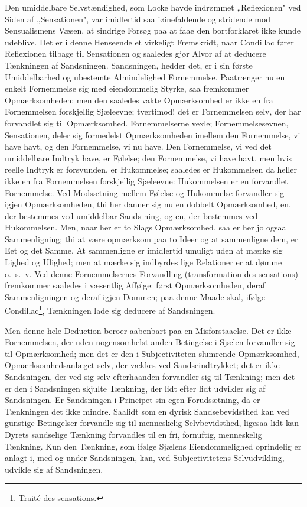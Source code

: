 \documentclass[12pt]{book}
\newcommand{\opage}[1]{\marginnote{\footnotesize\textit{[#1]}}}
\begin{document}
Den umiddelbare Selvstændighed, som Locke havde indrømmet „Reflexionen" ved Siden af
„Sensationen", var imidlertid saa iøinefaldende og stridende mod Sensualismens Væsen,
at sindrige Forsøg paa at faae den bortforklaret ikke kunde udeblive. Det er i denne
Henseende et virkeligt Fremskridt, naar Condillac fører Reflexionen tilbage til
Sensationen og saaledes gjør Alvor af at deducere Tænkningen af Sandsningen.
Sandsningen, hedder det, er i sin første Umiddelbarhed og ubestemte Almindelighed
Fornemmelse. Paatrænger nu en enkelt Fornemmelse sig med eiendommelig Styrke, saa
fremkommer Opmærksomheden; men den saaledes vakte Opmærksomhed er ikke en fra
Fornemmelsen forskjellig Sjæleevne; tvertimod! det er Fornemmelsen selv, der har
forvandlet sig til Opmærksomhed. Fornemmelserne vexle; Fornemmelsesevnen,
Sensationen, deler sig formedelst Opmærksomheden imellem den Fornemmelse, vi have
havt, og den Fornemmelse, vi nu have. Den Fornemmelse, vi ved det umiddelbare Indtryk
have, er Følelse; den Fornemmelse, vi have havt, men hvis reelle Indtryk er
forsvunden, er Hukommelse; saaledes er Hukommelsen da heller ikke en fra Fornemmelsen
forskjellig Sjæleevne: Hukommelsen er en forvandlet Fornemmelse. Ved Modsætning
mellem Følelse og Hukommelse forvandler sig igjen Opmærksomheden, thi her danner sig
nu en dobbelt Opmærksomhed, en, der bestemmes ved umiddelbar Sands%
\opage{27} ning, og en, der bestemmes ved Hukommelsen. Men, naar her er to Slags Opmærksomhed,
saa er her jo ogsaa Sammenligning; thi at være opmærksom paa to Ideer og at
sammenligne dem, er Eet og det Samme. At sammenligne er imidlertid umuligt uden at
mærke sig Lighed og Ulighed; men at mærke sig indbyrdes lige Relationer er at dømme
o.\ s.\ v. Ved denne Fornemmelsernes Forvandling (transformation des sensations)
fremkommer saaledes i væsentlig Affølge: først Opmærksomheden, deraf Sammenligningen
og deraf igjen Dommen; paa denne Maade skal, ifølge Condillac\footnote{Traité des
sensations.}, Tænkningen lade sig deducere af Sandsningen.

Men denne hele Deduction beroer aabenbart paa en Misforstaaelse. Det er ikke
Fornemmelsen, der uden nogensomhelst anden Betingelse i Sjælen forvandler sig til
Opmærksomhed; men det er den i Subjectiviteten slumrende Opmærksomhed,
Opmærksomhedsanlæget selv, der vækkes ved Sandseindtrykket; det er ikke Sandsningen,
der ved sig selv efterhaanden forvandler sig til Tænkning; men det er den i
Sandsningen skjulte Tænkning, der lidt efter lidt udvikler sig af Sandsningen. Er
Sandsningen i Principet sin egen Forudsætning, da er Tænkningen det ikke mindre.
Saalidt som en dyrisk Sandsebevidsthed kan ved gunstige Betingelser forvandle sig til
menneskelig Selvbevidsthed, ligesaa lidt kan Dyrets sandselige Tænkning forvandles
til en fri, fornuftig, menneskelig Tænkning. Kun den Tænkning, som ifølge Sjælens
Eiendommelighed oprindelig er anlagt i, med og under Sandsningen, kan, ved
Subjectivitetens Selvudvikling, udvikle sig af Sandsningen.
\end{document}
